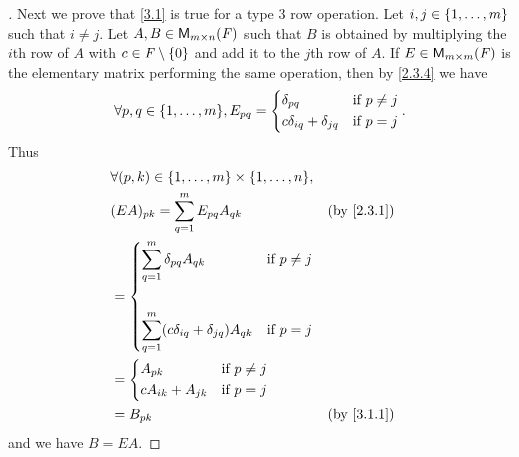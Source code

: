 \begin{proof}[]
	Next we prove that \cref{3.1} is true for a type 3 row operation.
	Let \(i, j \in \left\lbrace1, \dots, m\right\rbrace\) such that \(i \neq j\).
	Let \(A, B \in \ms\) such that \(B\) is obtained by multiplying the \(i\)th row of \(A\) with \(c \in \mathit{F} \setminus \left\lbrace0\right\rbrace\) and add it to the \(j\)th row of \(A\).
	If \(E \in \ms[m][m][\F]\) is the elementary matrix performing the same operation, then by \cref{2.3.4} we have
	\[
		\forall p, q \in \set{1, \dots, m}, E_{p q} = \begin{dcases}
			\delta_{p q}                  & \text{if } p \neq j \\
			c \delta_{i q} + \delta_{j q} & \text{if } p = j
		\end{dcases}.
	\]
	Thus
	\begin{align*}
		 & \forall (p, k) \in \set{1, \dots, m} \times \set{1, \dots, n},                                                        \\
		 & (EA)_{p k} = \sum_{q = 1}^m E_{p q} A_{q k}                                                           &  & \by{2.3.1} \\
		 & = \begin{dcases}
			     \sum_{q = 1}^m \delta_{p q} A_{q k}                    & \text{if } p \neq j \\                    \\
			     \sum_{q = 1}^m (c \delta_{i q} + \delta_{j q}) A_{q k} & \text{if } p = j
		     \end{dcases}                  \\
		 & = \begin{dcases}
			     A_{p k}             & \text{if } p \neq j \\
			     c A_{i k} + A_{j k} & \text{if } p = j
		     \end{dcases}                                                                           \\
		 & = B_{p k}                                                                                             &  & \by{3.1.1}
	\end{align*}
	and we have \(B = EA\).


\end{proof}
